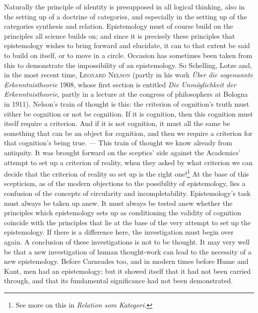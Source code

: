 \documentclass[12pt]{book}
\newcommand{\opage}[1]{\marginnote{\footnotesize\textit{[#1]}}}
\begin{document}
Naturally the principle of identity is presupposed in all logical thinking, also
in the setting up of a doctrine of categories, and especially in the setting up
of the categories synthesis and relation. Epistemology must of course build on
the principles all science builds on; and since it is precisely these principles
that epistemology wishes to bring forward and elucidate, it can to that extent
be said to build on itself, or to move in a circle. Occasion has sometimes been
taken from this to demonstrate the impossibility of an epistemology. So
Schelling, Lotze and, in the most recent time, \textsc{Leonard Nelson} (partly
in his work \textit{Über die sogenannte Erkenntnistheorie} 1908, whose first
section is entitled \textit{Die Unmöglichkeit der Erkenntnistheorie}, partly in
a lecture at the congress of philosophers at Bologna in 1911). Nelson's train of
thought is this: the criterion of cognition's truth must either be cognition or
not be cognition. If it is cognition, then this cognition must itself require a
criterion. And if it is not \opage{44}cognition, it must all the same be something that
can be an object for cognition, and then we require a criterion for that
cognition's being true. --- This train of thought we know already from
antiquity. It was brought forward on the sceptics' side against the Academics'
attempt to set up a criterion of reality, when they asked by what criterion we
can decide that the criterion of reality so set up is the right
one!\footnote{See more on this in \textit{Relation som Kategori.}} At the base of
this scepticism, as of the modern objections to the possibility of epistemology,
lies a confusion of the concepts of circularity and incompletability.
Epistemology's task must always be taken up anew. It must always be tested anew
whether the principles which epistemology sets up as conditioning the validity
of cognition coincide with the principles that lie at the base of the very
attempt to set up the epistemology. If there is a difference here, the
investigation must begin over again. A conclusion of these investigations is not
to be thought. It may very well be that a new investigation of human thought-work
can lead to the necessity of a new epistemology. Before Carneades too, and in
modern times before Hume and Kant, men had an epistemology; but it showed itself
that it had not been carried through, and that its fundamental significance had
not been demonstrated.
\end{document}
